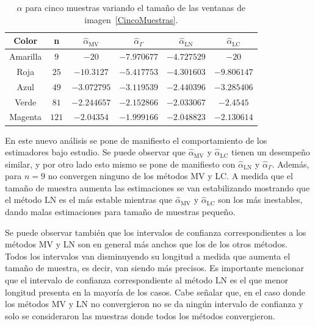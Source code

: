 \begin{table}[H]
	\centering
	\caption{\label{TablaCincoMuestras}$\widehat{\alpha}$ para cinco muestras variando el tamaño de las ventanas de imagen~\ref{CincoMuestras}.}
	\begin{tabular}{c*5{c}}
		\toprule
		Color       &  n    &  $\widehat{\alpha}_{\text{MV}}$    &  $\widehat{\alpha}_{\Gamma}$  &  $\widehat{\alpha}_{\text{LN}}$ &  $\widehat{\alpha}_{\text{LC}}$\\
		\midrule
		Amarilla    & $9$     & $-20$       & $-7.970677$ & $-4.727529$ & $-20$\\
		Roja        & $25$    & $-10.3127$  & $-5.417753$ & $-4.301603$ & $-9.806147$\\
		Azul        & $49$    & $-3.072795$ & $-3.119539$ & $-2.440396$ & $-3.285406$\\
		Verde       & $81$    & $-2.244657$ & $-2.152866$ & $-2.033067$ & $-2.4545$\\
		Magenta     & $121$   & $-2.04354$  & $-1.999166$ & $-2.048823$ & $-2.130614$\\
		\bottomrule
	\end{tabular}
\end{table}

En este nuevo análisis se pone de manifiesto el comportamiento de los estimadores bajo estudio. Se puede observar que $\widehat{\alpha}_{\text{MV}}$ y $\widehat{\alpha}_{\text{LC}}$ tienen un desempeño similar, y por otro lado esto mismo se pone de manifiesto con $\widehat{\alpha}_{\text{LN}}$ y $\widehat{\alpha}_{\Gamma}$. Además, para $n=9$ no convergen ninguno de los métodos MV y LC. A medida que el tamaño de muestra aumenta las estimaciones se van estabilizando mostrando que el método LN es el más estable mientras que $\widehat{\alpha}_{\text{MV}}$ y $\widehat{\alpha}_{\text{LC}}$ son los más inestables, dando malas estimaciones para tamaño de muestras pequeño. 

Se puede observar también que los intervalos de confianza correspondientes a los métodos MV y LN son en general más anchos que los de los otros métodos. Todos los intervalos van disminuyendo su longitud a medida que aumenta el tamaño de muestra, es decir, van siendo más precisos. Es importante mencionar que el intervalo de confianza correspondiente al método LN es el que menor longitud presenta en la mayoría de los casos. Cabe señalar que, en el caso donde los métodos MV y LN no convergieron no se da ningún intervalo de confianza y solo se consideraron las muestras donde todos los métodos convergieron.

